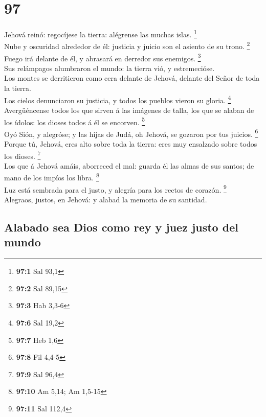 \hypertarget{section-96}{%
\section{97}\label{section-96}}

 Jehová reinó: regocíjese la tierra: alégrense las muchas
islas. \footnote{\textbf{97:1} Sal 93,1}\\
 Nube y oscuridad alrededor de él: justicia y juicio son
el asiento de su trono. \footnote{\textbf{97:2} Sal 89,15}\\
 Fuego irá delante de él, y abrasará en derredor sus
enemigos. \footnote{\textbf{97:3} Hab 3,3-6}\\
 Sus relámpagos alumbraron el mundo: la tierra vió, y
estremecióse.\\
 Los montes se derritieron como cera delante de Jehová,
delante del Señor de toda la tierra.\\
 Los cielos denunciaron su justicia, y todos los pueblos
vieron su gloria. \footnote{\textbf{97:6} Sal 19,2}\\
 Avergüéncense todos los que sirven á las imágenes de
talla, los que se alaban de los ídolos: los dioses todos á él se
encorven. \footnote{\textbf{97:7} Heb 1,6}\\
 Oyó Sión, y alegróse; y las hijas de Judá, oh Jehová, se
gozaron por tus juicios. \footnote{\textbf{97:8} Fil 4,4-5}\\
 Porque tú, Jehová, eres alto sobre toda la tierra: eres
muy ensalzado sobre todos los dioses. \footnote{\textbf{97:9} Sal 96,4}\\
 Los que á Jehová amáis, aborreced el mal: guarda él las
almas de sus santos; de mano de los impíos los libra. \footnote{\textbf{97:10}
  Am 5,14; Am 1,5-15}\\
 Luz está sembrada para el justo, y alegría para los
rectos de corazón. \footnote{\textbf{97:11} Sal 112,4}\\
 Alegraos, justos, en Jehová: y alabad la memoria de su
santidad.

\hypertarget{alabado-sea-dios-como-rey-y-juez-justo-del-mundo}{%
\subsection{Alabado sea Dios como rey y juez justo del
mundo}\label{alabado-sea-dios-como-rey-y-juez-justo-del-mundo}}

